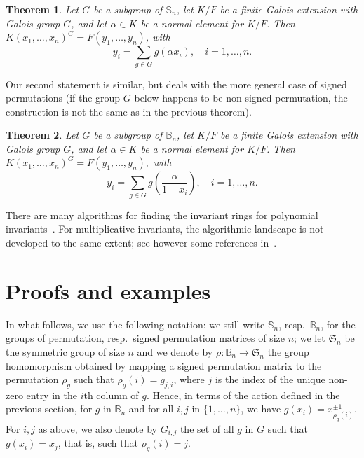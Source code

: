 \documentclass[12pt]{article}
\theoremstyle{plain}
\newtheorem{theorem}{Theorem}
\begin{document}
\begin{theorem}\label{nonamenonsign}
  Let $G$ be a subgroup of $\mathbb{S}_n$, let $K/F$ be a finite
  Galois extension with Galois group $G$, and let $\alpha \in K$ be a
  normal element for $K/F$. Then $ K(x_1,\ldots ,
  x_n)^G=F(y_1,\dots,y_n)$, with
  $$y_i =\sum_{g \in G} g(\alpha x_i), \quad i = 1,\dots,n.$$
\end{theorem}

Our second statement is similar, but deals with the more general case
of signed permutations (if the group $G$ below happens to be non-signed
permutation, the construction is not the same as in the previous theorem).

\begin{theorem}\label{nonamesign}
  Let $G$ be a subgroup of $\mathbb{B}_n$, let $K/F$ be a finite
  Galois extension with Galois group $G$, and let $\alpha \in K$ be a
  normal element for $K/F$. Then
  $K(x_1,\ldots, x_n)^G = F(y_1, \ldots, y_{n}),$
  with $$y_i = \sum_{g \in G} g\left (\frac{\alpha}{1+x_i}\right), \quad i = 1,\dots,n.$$
\end{theorem}

There are many algorithms for finding the invariant rings for
polynomial invariants~\cite{Sturmfels,Kemper2}. For multiplicative
invariants, the algorithmic landscape is not developed to the same
extent; see however some references in~\cite{Kemper,Lorenz,Renault}.


\section{Proofs and examples}


In what follows, we use the following notation: we still write
$\mathbb{S}_n$, resp.\ $\mathbb{B}_n$, for the groups of permutation,
resp.\ signed permutation matrices of size $n$; we let
$\mathfrak{S}_n$ be the symmetric group of size $n$ and we denote by
$\rho: \mathbb{B}_n \to \mathfrak{S}_n$ the group homomorphism
obtained by mapping a signed permutation matrix to the permutation
$\rho_g$ such that $\rho_g(i)=g_{j,i}$, where $j$ is the index of the
unique non-zero entry in the $i$th column of $g$.  Hence, in terms of
the action defined in the previous section, for $g$ in $\mathbb{B}_n$
and for all $i,j$ in $\{1,\dots,n\}$, we have $g(x_i) =
x_{\rho_g(i)}^{\pm 1}$.  For $i,j$ as above, we also denote by
$G_{i,j}$ the set of all $g$ in $G$ such that $g(x_i)=x_j$, that is,
such that $\rho_g(i)=j$.
\end{document}
